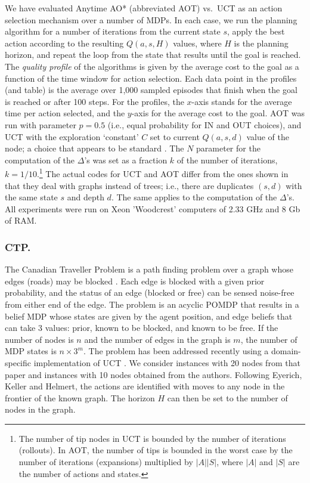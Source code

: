 \documentclass[letterpaper]{article}
\begin{document}
We have evaluated Anytime AO* (abbreviated AOT)  vs.\ UCT as an action selection mechanism
over a number of MDPs. In each case, we run the planning algorithm
for a number of iterations from the current state $s$,
apply the best action according to the resulting $Q(a,s,H)$ values,  where $H$ is the planning
horizon, and repeat the loop from the  state that results until the goal is reached.
The \emph{quality profile} of the algorithms is given by the average cost to the
goal  as a function of the time window for action selection.
Each data point in the profiles (and table) is the average over 1,000 sampled episodes
that finish when the goal is reached or after  100 steps. For the profiles, the $x$-axis
stands for the average time per action selected, and the $y$-axis  for the average cost to the goal.
AOT was run with parameter  $p=0.5$ (i.e., equal probability for IN and OUT choices),
and UCT with the exploration `constant' $C$ set to current $Q(a,s,d)$ value of the node;
a choice that appears to be   standard \cite{fern:uct,malte:ctp}.
The $N$ parameter for the computation of the $\Delta$'s was
set as a fraction $k$ of the number of iterations, $k=1/10$.\footnote{The number of tip nodes
in UCT is bounded by the number of iterations (rollouts). In AOT, the number
of tips is bounded in the worst case by the number of iterations (expansions) multiplied by
$|A||S|$,  where $|A|$ and $|S|$ are the number of actions and states.}
The actual codes for UCT and AOT differ from the ones shown
in that they deal with graphs instead of trees; i.e., there are duplicates
$(s,d)$ with the same state $s$ and depth $d$. The same applies to the computation
of the $\Delta$'s.
All experiments were run on Xeon 'Woodcrest' computers of 2.33 GHz and 8 Gb of RAM.

\subsubsection{CTP.} The  Canadian Traveller Problem  is  a path
finding problem over a graph whose edges (roads) may be blocked
 \cite{ctp:intro}. Each edge is blocked with a given prior probability,
and the status of an edge (blocked or free) can be sensed noise-free
from either end of the edge. The problem is an acyclic POMDP that
results in a belief MDP whose states are given by the agent position,
and edge  beliefs that can take 3 values: prior, known to be blocked, and
known to be free.  If the number of nodes is $n$ and the number of edges
in the graph is $m$, the number of MDP states is  $n \times 3^m$.
The problem has been addressed recently using a
domain-specific implementation of UCT \cite{malte:ctp}.
We consider instances with 20 nodes from that paper
and instances  with 10 nodes obtained from the authors.
Following  Eyerich,  Keller and Helmert, the actions are  identified with moves
to any node in the  frontier of the known graph. The horizon $H$ can then
be set to the number of nodes in the graph.
\end{document}
